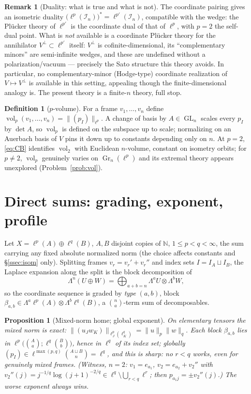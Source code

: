 \documentclass[11pt]{amsart}
\newtheorem{proposition}[theorem]{Proposition}
\theoremstyle{definition}
\newtheorem{definition}[theorem]{Definition}
\newtheorem{remark}[theorem]{Remark}
\newcommand{\N}{\mathbb{N}}
\newcommand{\Gr}{\operatorname{Gr}}
\newcommand{\GL}{\operatorname{GL}}
\newcommand{\vol}{\operatorname{vol}}
\begin{document}
\begin{remark}[Duality: what is true and what is not]\label{rem:dual}
The coordinate pairing gives an isometric duality $\big(\ell^p(\mathcal I_n)\big)^*=\ell^{p'}(\mathcal I_n)$, compatible with the wedge: the Pl\"ucker theory of $\ell^{p'}$ is the coordinate dual of that of $\ell^p$, with $p=2$ the self-dual point. What is \emph{not} available is a coordinate Pl\"ucker theory for the annihilator $V^\perp\subset\ell^{p'}$ itself: $V^\perp$ is cofinite-dimensional, its ``complementary minors'' are semi-infinite wedges, and these are undefined without a polarization/vacuum --- precisely the Sato structure this theory avoids. In particular, no complementary-minor (Hodge-type) coordinate realization of $V\mapsto V^\perp$ is available in this setting, appealing though the finite-dimensional analogy is. The present theory is a finite-$n$ theory, full stop.
\end{remark}

\begin{definition}[$p$-volume]\label{def:pvol}
For a frame $v_1,\dots,v_n$ define $\vol_p(v_1,\dots,v_n)=\|(p_I)\|_{\ell^p}$. A change of basis by $A\in\GL_n$ scales every $p_I$ by $\det A$, so $\vol_p$ is defined on the subspace up to scale; normalizing on an Auerbach basis of $V$ \cite[1.c]{LT1} pins it down up to constants depending only on $n$. At $p=2$, \eqref{eq:CB} identifies $\vol_2$ with Euclidean $n$-volume, constant on isometry orbits; for $p\ne2$, $\vol_p$ genuinely varies on $\Gr_n(\ell^p)$ and its extremal theory appears unexplored (Problem~\ref{prob:vol}).
\end{definition}

\section{Direct sums: grading, exponent, profile}\label{sec:sums}

Let $X=\ell^p(A)\oplus\ell^q(B)$, $A,B$ disjoint copies of $\N$, $1\le p<q<\infty$, the sum carrying any fixed absolute normalized norm (the choice affects constants and \S\ref{ssec:isom} only). Splitting frames $v_r=v_r'+v_r''$ and index sets $I=I_A\sqcup I_B$, the Laplace expansion along the split is the block decomposition of
\[
\Lambda^n(U\oplus W)=\bigoplus_{a+b=n}\Lambda^aU\otimes\Lambda^bW,
\]
so the coordinate sequence is graded by \emph{type} $(a,b)$, block $\beta_{a,b}\in\Lambda^a\ell^p(A)\otimes\Lambda^b\ell^q(B)$, a $\binom{n}{a}$-term sum of decomposables.

\begin{proposition}[Mixed-norm home; global exponent]\label{prop:maxpq}
On elementary tensors the mixed norm is exact:
$\big\|(u_Jw_K)\big\|_{\ell^p_J(\ell^q_K)}=\|u\|_p\|w\|_q$.
Each block $\beta_{a,b}$ lies in $\ell^p\big(\binom{A}{a};\ell^q\binom{B}{b}\big)$, hence in $\ell^{q}$ of its index set; globally $(p_I)\in\ell^{\max(p,q)}\binom{A\sqcup B}{n}=\ell^{q}$, and this is sharp: no $r<q$ works, even for genuinely mixed frames. \textup{(}Witness, $n=2$: $v_1=e_{a_1}$, $v_2=e_{a_2}+v_2''$ with $v_2''(j)=j^{-1/q}\log(j{+}1)^{-2/q}\in\ell^q\setminus\bigcup_{r<q}\ell^r$; then $p_{a_1 j}=\pm v_2''(j)$.\textup{)} The worse exponent always wins.
\end{proposition}
\end{document}
